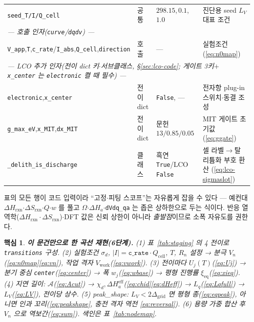 \documentclass[11pt,a4paper]{article}
\newtheorem*{keybox}{핵심}
\newcommand{\eff}{\mathrm{eff}}
\newcommand{\eq}{\mathrm{eq}}
\newcommand{\cell}{\mathrm{cell}}
\newcommand{\rxn}{\mathrm{rxn}}
\newcommand{\work}{\mathrm{work}}
\newcommand{\code}[1]{\texttt{#1}}
\begin{document}
\begin{table}[t]
\begin{tabular}{l l l l}
\code{seed\_T/I/Q\_cell} & 공통 & $298.15$,\,$0.1$,\,$1.0$ & 진단용 seed $L_V$ 대표 조건 \\
\multicolumn{4}{l}{\emph{— 호출 인자(\code{curve}/\code{dqdv}) —}}\\
\code{V\_app},\code{T},\code{c\_rate}/\code{I\_abs},\code{Q\_cell},\code{direction} & 호출 & --- & 실험조건 (\eqref{eq:n0map}) \\
\multicolumn{4}{l}{\emph{— LCO 추가 인자(전이 dict 키$\cdot$서브클래스, \S\ref{sec:lco-code}; 게이트 3키$+$\code{x\_center} 는 \code{electronic} 켤 때 필수) —}}\\
\code{electronic},\code{x\_center} & 전이 dict & \code{False}, — & 전자항 plug-in 스위치$\cdot$동결 조성 \\
\code{g\_max\_eV},\code{x\_MIT},\code{dx\_MIT} & 전이 dict & 문헌 $13/0.85/0.05$ & MIT 게이트 초기값 (\eqref{eq:ggate}) \\
\code{\_delith\_is\_discharge} & 클래스 & 흑연 \code{True}/LCO \code{False} & 셀 라벨$\to$탈리튬화 부호 환산 (\eqref{eq:lco-sigmaslot}) \\
\bottomrule
\end{tabular}
\end{table}

표의 모든 행이 코드 입력이라 ``고정$\cdot$피팅 스코프''는 자유롭게 잡을 수 있다 — 예컨대
$\Delta H_\rxn$$\cdot$$\Delta S_\rxn$$\cdot$$Q$$\cdot$$w$ 를 풀고 $\Omega$$\cdot$$\Delta H_a$$\cdot$\code{dVdq\_qa}
는 좁은 상하한으로 두는 식이다. 반응 열역학($\Delta H_\rxn\cdot\Delta S_\rxn$)$\cdot$DFT 값은 신뢰 상한이 아니라
\emph{출발점}이므로 소폭 자유도를 권한다.

\begin{keybox}
\textbf{이 문건만으로 한 곡선 재현(6단계).}
(1) 표~\ref{tab:staging} 의 4 전이로 \code{transitions} 구성.
(2) 실험조건 $\sigma_d$, $|I|=\code{c\_rate}\cdot Q_\cell$, $T$, $R_n$ 설정 → 분극 $V_n$(\eqref{eq:n0map}\eqref{eq:vn}), 작업 격자 $V_\work$(\eqref{eq:vwork}).
(3) 전이마다 $U_j(T)$(\eqref{eq:Uj}) → 분기 중심 \code{center}(\eqref{eq:center}) → 폭 $w_j$(\eqref{eq:wbase}) → 평형 진행률 $\xi_\eq$(\eqref{eq:xieq}).
(4) 지연 길이: $\mathcal A$(\eqref{eq:Acut}) → $\chi_d,\Delta H_a^\eff$(\eqref{eq:chid}\eqref{eq:dHeff}) → $L_q$(\eqref{eq:Lqfull}) → $L_V$(\eqref{eq:LV}), 전이당 상수.
(5) peak\_shape: $L_V<2\Delta_\mathrm{grid}$ 면 평형 종(\eqref{eq:eqpeak}), 아니면 인과 꼬리(\eqref{eq:peakshape}, 충전 격자 역전 \eqref{eq:reversal}).
(6) 용량 가중 합산 후 $V_n$ 으로 역보간(\eqref{eq:sum}). 색인은 표~\ref{tab:nodemap}.
\end{keybox}
\end{document}
